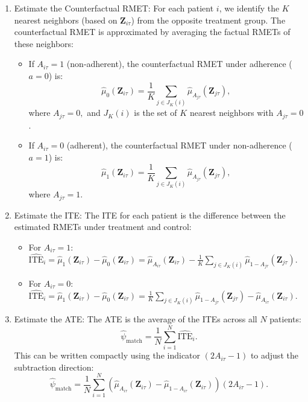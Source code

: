 \begin{enumerate}
\item Estimate the Counterfactual RMET:
   For each patient $ i $, we identify the $ K $ nearest neighbors (based on $ \mathbf{Z}_{i\tau} $) from the opposite treatment group.
The counterfactual RMET is approximated by averaging the factual RMETs of these neighbors:
   \begin{itemize}
   \item If $ A_{i\tau} = 1 $ (non-adherent), the counterfactual RMET under adherence ($ a = 0 $) is:
     $$ \widehat{\mu}_{0}(\mathbf{Z}_{i\tau}) = \frac{1}{K} \sum_{j \in J_K(i)} \widehat{\mu}_{A_{j\tau}}(\mathbf{Z}_{j\tau}),$$
     where $ A_{j\tau} = 0, $
     and $ J_K(i) $ is the set of $ K $ nearest neighbors with $ A_{j\tau} = 0 $.
   \item If $ A_{i\tau} = 0 $ (adherent), the counterfactual RMET under non-adherence ($ a = 1 $) is:
     $$ \widehat{\mu}_{1}(\mathbf{Z}_{i\tau}) = \frac{1}{K} \sum_{j \in J_K(i)} \widehat{\mu}_{A_{j\tau}}(\mathbf{Z}_{j\tau}),$$ where $A_{j\tau} = 1. $
    \end{itemize}
\item Estimate the ITE:
   The ITE for each patient is the difference between the estimated RMETs under treatment and control:
   \begin{itemize}
   \item For $ A_{i\tau} = 1 $:
     $ \widehat{\text{ITE}}_i = \widehat{\mu}_{1}(\mathbf{Z}_{i\tau}) - \widehat{\mu}_{0}(\mathbf{Z}_{i\tau}) = \widehat{\mu}_{A_{i\tau}}(\mathbf{Z}_{i\tau}) - \frac{1}{K} \sum_{j \in J_K(i)} \widehat{\mu}_{1-A_{j\tau}}(\mathbf{Z}_{j\tau}). $
   \item For $ A_{i\tau} = 0 $:
     $ \widehat{\text{ITE}}_i = \widehat{\mu}_{1}(\mathbf{Z}_{i\tau}) - \widehat{\mu}_{0}(\mathbf{Z}_{i\tau}) = \frac{1}{K} \sum_{j \in J_K(i)} \widehat{\mu}_{1-A_{j\tau}}(\mathbf{Z}_{j\tau}) - \widehat{\mu}_{A_{i\tau}}(\mathbf{Z}_{i\tau}). $
    \end{itemize}
\item Estimate the ATE:
   The ATE is the average of the ITEs across all $ N $ patients:
   $$ \widehat{\psi}_{\text{match}} = \frac{1}{N} \sum_{i=1}^{N} \widehat{\text{ITE}}_i. $$
   This can be written compactly using the indicator $ (2 A_{i\tau} - 1) $ to adjust the subtraction direction:
   {\footnotesize
   $$ \widehat{\psi}_{\text{match}} = \frac{1}{N} \sum_{i=1}^{N} \left( \widehat{\mu}_{A_{i\tau}}(\mathbf{Z}_{i\tau}) - \widehat{\mu}_{1 - A_{i\tau}}(\mathbf{Z}_{i\tau}) \right) (2 A_{i\tau} - 1). $$}
   \begin{itemize}

\end{itemize}
\end{enumerate}
